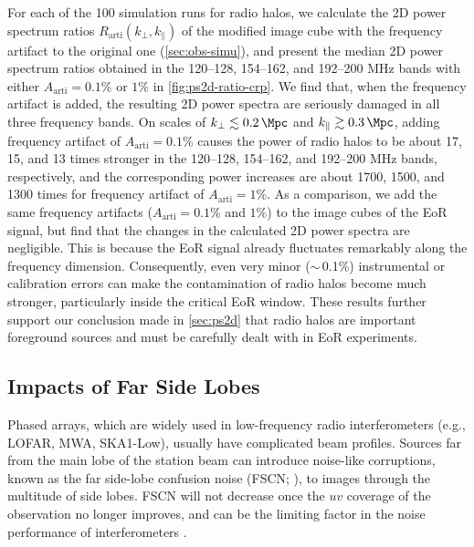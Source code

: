 \documentclass[twocolumn]{aastex62}
\newcommand{\R}[1]{\mathrm{#1}}
\newcommand{\klos}{\text{$k_{\parallel}$}}
\newcommand{\kperp}{\text{$k_{\bot}$}}
\begin{document}
For each of the 100 simulation runs for radio halos, we calculate the
2D power spectrum ratios $R_{\R{arti}}(\kperp, \klos)$ of the modified
image cube with the frequency artifact to the original one
(\autoref{sec:obs-simu}),
and present the median 2D power spectrum ratios obtained in the
\numrange{120}{128}, \numrange{154}{162}, and \numrange{192}{200} \si{\MHz}
bands with either $A_{\R{arti}} = 0.1\%$ or $1\%$ in \autoref{fig:ps2d-ratio-crp}.
We find that, when the frequency artifact is added, the resulting 2D
power spectra are seriously damaged in all three frequency bands.
On scales of $\kperp \lesssim \SI{0.2}{\per\Mpc}$ and
$\klos \gtrsim \SI{0.3}{\per\Mpc}$,
adding frequency artifact of $A_{\R{arti}} = 0.1\%$
causes the power of radio halos to be about 17, 15, and 13 times stronger
in the \numrange{120}{128}, \numrange{154}{162}, and \numrange{192}{200}
\si{\MHz} bands, respectively, and the corresponding power increases are
about 1700, 1500, and 1300 times for frequency artifact of
$A_{\R{arti}} = 1\%$.
As a comparison, we add the same frequency artifacts
($A_{\R{arti}} = 0.1\%$ and $1\%$) to the image
cubes of the EoR signal, but find that the changes in the calculated
2D power spectra are negligible.
This is because the EoR signal already fluctuates remarkably along
the frequency dimension.
Consequently, even very minor ($\sim$\,0.1\%) instrumental or
calibration errors can make the contamination of radio halos
become much stronger, particularly inside the critical EoR window.
These results further support our conclusion made in \autoref{sec:ps2d}
that radio halos are important foreground sources and must be carefully
dealt with in EoR experiments.

\subsection{Impacts of Far Side Lobes}
\label{sec:far-sidelobes}

Phased arrays, which are widely used in low-frequency radio
interferometers (e.g., LOFAR, MWA, SKA1-Low), usually have complicated
beam profiles.
Sources far from the main lobe of the station beam can introduce
noise-like corruptions, known as the far side-lobe confusion noise
(FSCN; \citealt{smirnov2012}), to images through the multitude of
side lobes.
FSCN will not decrease once the $uv$ coverage of the observation no
longer improves, and can be the limiting factor in the noise
performance of interferometers \citep{mort2017}.
\end{document}
